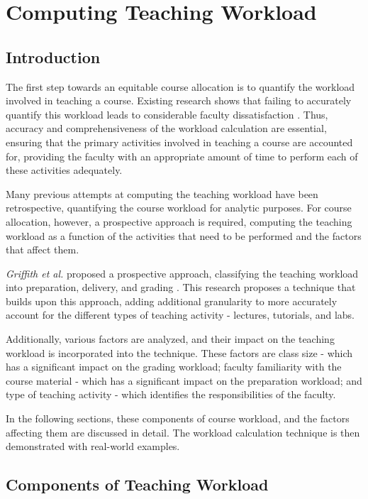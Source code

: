 \chapter{Computing Teaching Workload}
\label{ch:teaching_workload}

\section{Introduction}

The first step towards an equitable course allocation is to quantify the workload involved in teaching a course. Existing research shows that failing to accurately quantify this workload leads to considerable faculty dissatisfaction \cite{watts2011burnout}. Thus, accuracy and comprehensiveness of the workload calculation are essential, ensuring that the primary activities involved in teaching a course are accounted for, providing the faculty with an appropriate amount of time to perform each of these activities adequately.

Many previous attempts at computing the teaching workload have been retrospective, quantifying the course workload for analytic purposes. For course allocation, however, a prospective approach is required, computing the teaching workload as a function of the activities that need to be performed and the factors that affect them.

\textit{Griffith et al.} proposed a prospective approach, classifying the teaching workload into preparation, delivery, and grading \cite{griffith2020framework}. This research proposes a technique that builds upon this approach, adding additional granularity to more accurately account for the different types of teaching activity - lectures, tutorials, and labs.

Additionally, various factors are analyzed, and their impact on the teaching workload is incorporated into the technique. These factors are class size - which has a significant impact on the grading workload; faculty familiarity with the course material - which has a significant impact on the preparation workload; and type of teaching activity - which identifies the responsibilities of the faculty.

In the following sections, these components of course workload, and the factors affecting them are discussed in detail. The workload calculation technique is then demonstrated with real-world examples.

\section{Components of Teaching Workload}

